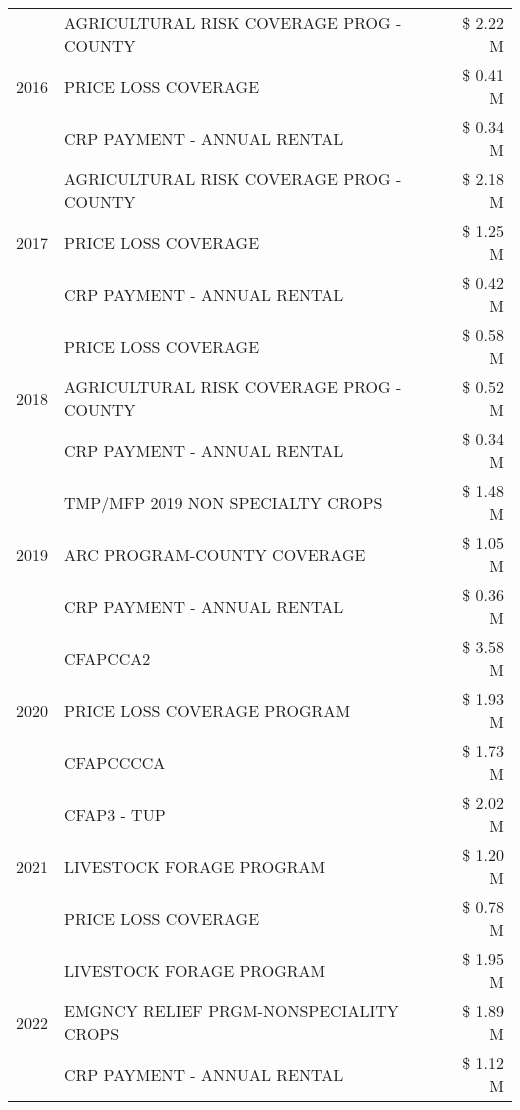 \begin{tabular}{llr}
\cline{1-3}
\multirow[t]{3}{*}{2016} & AGRICULTURAL RISK COVERAGE PROG - COUNTY & \$ 2.22 M \\
 & PRICE LOSS COVERAGE & \$ 0.41 M \\
 & CRP PAYMENT - ANNUAL RENTAL & \$ 0.34 M \\
\cline{1-3}
\multirow[t]{3}{*}{2017} & AGRICULTURAL RISK COVERAGE PROG - COUNTY & \$ 2.18 M \\
 & PRICE LOSS COVERAGE & \$ 1.25 M \\
 & CRP PAYMENT - ANNUAL RENTAL & \$ 0.42 M \\
\cline{1-3}
\multirow[t]{3}{*}{2018} & PRICE LOSS COVERAGE & \$ 0.58 M \\
 & AGRICULTURAL RISK COVERAGE PROG - COUNTY & \$ 0.52 M \\
 & CRP PAYMENT - ANNUAL RENTAL & \$ 0.34 M \\
\cline{1-3}
\multirow[t]{3}{*}{2019} & TMP/MFP 2019 NON SPECIALTY CROPS & \$ 1.48 M \\
 & ARC PROGRAM-COUNTY COVERAGE & \$ 1.05 M \\
 & CRP PAYMENT - ANNUAL RENTAL & \$ 0.36 M \\
\cline{1-3}
\multirow[t]{3}{*}{2020} & CFAPCCA2 & \$ 3.58 M \\
 & PRICE LOSS COVERAGE PROGRAM & \$ 1.93 M \\
 & CFAPCCCCA & \$ 1.73 M \\
\cline{1-3}
\multirow[t]{3}{*}{2021} & CFAP3 - TUP & \$ 2.02 M \\
 & LIVESTOCK FORAGE PROGRAM & \$ 1.20 M \\
 & PRICE LOSS COVERAGE & \$ 0.78 M \\
\cline{1-3}
\multirow[t]{3}{*}{2022} & LIVESTOCK FORAGE PROGRAM & \$ 1.95 M \\
 & EMGNCY RELIEF PRGM-NONSPECIALITY CROPS & \$ 1.89 M \\
 & CRP PAYMENT - ANNUAL RENTAL & \$ 1.12 M \\
\cline{1-3}
\bottomrule
\end{tabular}
